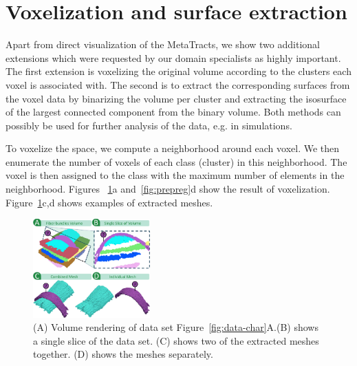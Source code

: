 \section {Voxelization and surface extraction}
\label{sec:vis}

Apart from direct visualization of the MetaTracts, we show two additional extensions which were requested by our domain specialists as highly important. The first extension is voxelizing the original volume according to the clusters each voxel is associated with.
The second is to extract the corresponding surfaces from the voxel data by binarizing the volume per cluster and extracting the isosurface of the largest connected component from the binary volume. Both methods can possibly be used for further analysis of the data, e.g. in simulations.

To voxelize the space,  we compute a neighborhood around each voxel. We then enumerate the number of voxels of each class (cluster) in this neighborhood. The voxel is then assigned to the class with the maximum number of elements in the neighborhood. Figures ~\ref{fig:crop-16-decomp}a and~\ref{fig:prepreg}d show the result of voxelization. Figure~\ref{fig:crop-16-decomp}c,d shows examples of extracted meshes.

\begin{figure}
\centering
		\includegraphics[width=0.4\textwidth]{images_pvis/figure7}
	\caption{(A) Volume rendering of data set Figure~\ref{fig:data-char}A.(B) shows a single slice of the data set. (C) shows two of the extracted meshes together. (D) shows the meshes separately.}
	\label{fig:crop-16-decomp}
\end{figure}  


